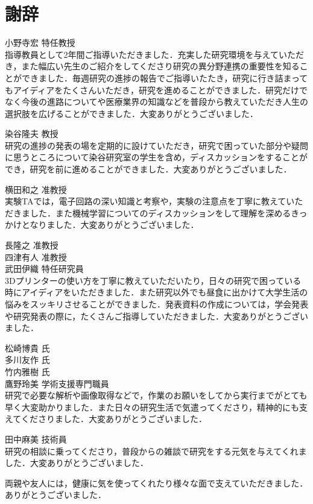 \chapter*{謝辞}%
%

小野寺宏 特任教授\\
指導教員として2年間ご指導いただきました．充実した研究環境を与えていただき，また幅広い先生のご紹介をしてくださり研究の異分野連携の重要性を知ることができました．毎週研究の進捗の報告でご指導いたたき，研究に行き詰まってもアイディアをたくさんいただき，研究を進めることができました．研究だけでなく今後の進路についてや医療業界の知識などを普段から教えていただき人生の選択肢を広げることができました．大変ありがとうございました．

染谷隆夫 教授\\
研究の進捗の発表の場を定期的に設けていただき，研究で困っていた部分や疑問に思うところについて染谷研究室の学生を含め，ディスカッションをすることができ，研究を前に進めることができました．大変ありがとうございました．

横田和之 准教授\\
実験TAでは，電子回路の深い知識と考察や，実験の注意点を丁寧に教えていただきました．また機械学習についてのディスカッションをして理解を深めるきっかけとなりました．大変ありがとうございました．

長隆之 准教授\\

四津有人 准教授\\

武田伊織 特任研究員\\
3Dプリンターの使い方を丁寧に教えていただいたり，日々の研究で困っている時にアイディアをいただきました．また研究以外でも昼食に出かけて大学生活の悩みをスッキリさせることができました．発表資料の作成については，学会発表や研究発表の際に，たくさんご指導していただきました．大変ありがとうございました．

松崎博貴 氏\\

多川友作 氏\\

竹内雅樹 氏\\

鷹野玲美 学術支援専門職員\\
研究で必要な解析や画像取得などで，作業のお願いをしてから実行までがとても早く大変助かりました．また日々の研究生活で気遣ってくださり，精神的にも支えてくださりました．大変ありがとうございました．

田中麻美 技術員\\
研究の相談に乗ってくださり，普段からの雑談で研究をする元気を与えてくれました．大変ありがとうございました．

\vspace{12pt}
両親や友人には，健康に気を使ってくれたり様々な面で支えていただきました．ありがとうございました．
